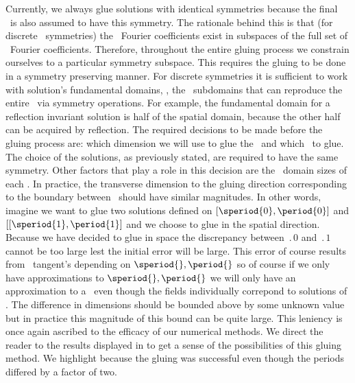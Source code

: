 Currently, we always glue solutions with identical symmetries because
the final \twot\ is also assumed to have this symmetry. The rationale
behind this is that (for discrete \spt\ symmetries) the \spt\ Fourier coefficients
exist in subspaces of the full set of \spt\ Fourier coefficients. Therefore,
throughout the entire gluing process we constrain ourselves to
a particular symmetry subspace. This requires the gluing
to be done in a symmetry preserving manner. For discrete symmetries
it is sufficient to work with solution's fundamental domains, \ie, the
\spt\ subdomains that can reproduce the entire \twot\ via
symmetry operations. For example, the fundamental domain
for a reflection invariant solution is half of the spatial domain, because the
other half can be acquired by reflection.
The required decisions to be made before the gluing
process are: which dimension we will use to glue
the \twots\ and which \twots\ to glue.
The choice of the solutions, as
previously stated, are required to have the same symmetry.
Other factors that play a role in this decision
are the \spt\ domain sizes of each \twot.
In practice, the transverse dimension to the gluing direction corresponding
to the boundary between \twots\ should have similar magnitudes.
In other words, imagine we want to
glue two solutions defined on $[\speriod{0},\period{0}]$
and $[[\speriod{1},\period{1}]$ and we choose to glue
in the spatial direction.
Because we have decided to glue in space the discrepancy between
$\period{0}$ and $\period{1}$ cannot be too large lest the initial error will
be large. This error of course results from \twots\ tangent's depending on $\speriod{},\period{}$ so
of course if we only have approximations to $\speriod{},\period{}$ we will
only have an approximation to a \twot\ even though the fields individually correpond
to solutions of . The difference in
dimensions should be bounded above by some unknown value but in practice
this magnitude of this bound can be quite large. This leniency is once again
ascribed to the efficacy of our numerical methods.
We direct the reader to the results displayed in
to get a sense of the possibilities of
this gluing method. We highlight
because
the gluing was successful even though the periods differed by a factor of two.

